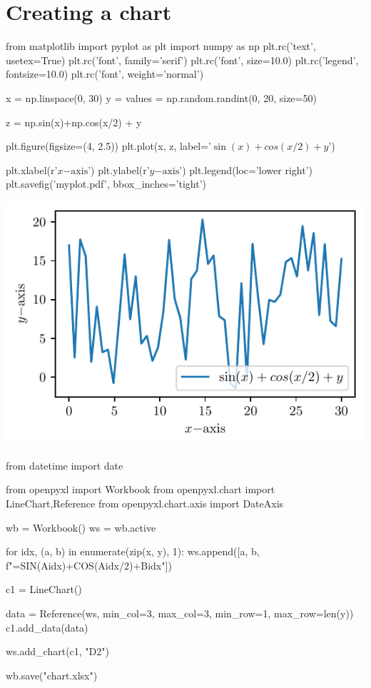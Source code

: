 \documentclass{article}
\begin{document}
\section{Creating a chart}
\begin{pycode}
from matplotlib import pyplot as plt
import numpy as np
plt.rc('text', usetex=True)
plt.rc('font', family='serif')
plt.rc('font', size=10.0)
plt.rc('legend', fontsize=10.0)
plt.rc('font', weight='normal')

x = np.linspace(0, 30)
y = values = np.random.randint(0, 20, size=50)

z = np.sin(x)+np.cos(x/2) + y

plt.figure(figsize=(4, 2.5))
plt.plot(x, z, label='$\sin(x) + cos(x/2) + y$')

plt.xlabel(r'$x\mathrm{-axis}$')
plt.ylabel(r'$y\mathrm{-axis}$')
plt.legend(loc='lower right')
plt.savefig('myplot.pdf', bbox_inches='tight')
\end{pycode}

\begin{center}
\includegraphics{myplot.pdf}
\end{center}


\begin{pycode}
from datetime import date

from openpyxl import Workbook
from openpyxl.chart import LineChart,Reference
from openpyxl.chart.axis import DateAxis

wb = Workbook()
ws = wb.active

for idx, (a, b) in enumerate(zip(x, y), 1):
    ws.append([a, b, f"=SIN(A{idx})+COS(A{idx}/2)+B{idx}"])

c1 = LineChart()

data = Reference(ws, min_col=3,  max_col=3, min_row=1, max_row=len(y))
c1.add_data(data)

ws.add_chart(c1, "D2")

wb.save("chart.xlsx")
\end{pycode}
\end{document}
